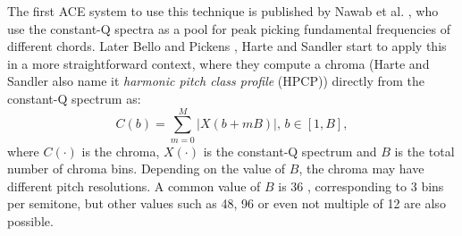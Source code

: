 The first ACE system to use this technique is published by Nawab et al. \cite{nawab2001identification}, who use the constant-Q spectra as a pool for peak picking fundamental frequencies of different chords. Later Bello and Pickens \cite{bello2005robust}, Harte and Sandler \cite{harte2005automatic} start to apply this in a more straightforward context, where they compute a chroma (Harte and Sandler also name it {\it harmonic pitch class profile} (HPCP)) directly from the constant-Q spectrum as:
\begin{equation}\label{eq:cqt-chroma}
C(b) = \sum_{m=0}^M |X(b+mB)| ,\, b \in [1,B],
\end{equation}
where $C(\cdot)$ is the chroma, $X(\cdot)$ is the constant-Q spectrum and $B$ is the total number of chroma bins. Depending on the value of $B$, the chroma may have different pitch resolutions. A common value of $B$ is 36 \cite{bello2005robust,harte2005automatic,oudre2010template,reed2009minimum,weil2009automatic,humphrey2012rethinking,cho2014improved}, corresponding to 3 bins per semitone, but other values such as 48, 96 or even not multiple of 12 are also possible.

